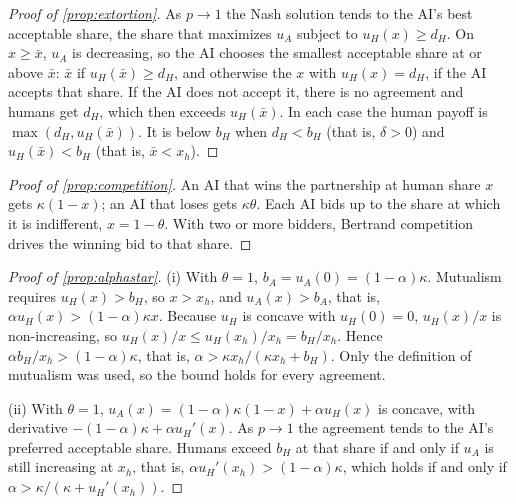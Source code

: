 \documentclass[article, 11pt, reqno]{amsart}
\theoremstyle{named}
\newcommand{\bH}{b_H}
\newcommand{\dH}{d_H}
\theoremstyle{plain}
\begin{document}
\begin{proof}[Proof of \cref{prop:extortion}]
As $p \to 1$ the Nash solution tends to the AI's best acceptable share, the share that maximizes $u_A$ subject to $u_H(x) \ge \dH$. On $x \ge \bar{x}$, $u_A$ is decreasing, so the AI chooses the smallest acceptable share at or above $\bar{x}$: $\bar{x}$ if $u_H(\bar x) \ge \dH$, and otherwise the $x$ with $u_H(x) = \dH$, if the AI accepts that share. If the AI does not accept it, there is no agreement and humans get $\dH$, which then exceeds $u_H(\bar{x})$. In each case the human payoff is $\max(\dH, u_H(\bar{x}))$. It is below $\bH$ when $\dH < \bH$ (that is, $\delta > 0$) and $u_H(\bar x) < \bH$ (that is, $\bar x < x_h$).
\end{proof}

\begin{proof}[Proof of \cref{prop:competition}]
An AI that wins the partnership at human share $x$ gets $\kappa(1-x)$; an AI that loses gets $\kappa\theta$. Each AI bids up to the share at which it is indifferent, $x = 1 - \theta$. With two or more bidders, Bertrand competition drives the winning bid to that share.
\end{proof}

\begin{proof}[Proof of \cref{prop:alphastar}]
(i) With $\theta = 1$, $b_A = u_A(0) = (1-\alpha)\kappa$. Mutualism requires $u_H(x) > \bH$, so $x > x_h$, and $u_A(x) > b_A$, that is, $\alpha u_H(x) > (1-\alpha)\kappa x$. Because $u_H$ is concave with $u_H(0) = 0$, $u_H(x)/x$ is non-increasing, so $u_H(x)/x \le u_H(x_h)/x_h = \bH/x_h$. Hence $\alpha \bH / x_h > (1-\alpha)\kappa$, that is, $\alpha > \kappa x_h/(\kappa x_h + \bH)$. Only the definition of mutualism was used, so the bound holds for every agreement.

(ii) With $\theta = 1$, $u_A(x) = (1-\alpha)\kappa(1-x) + \alpha u_H(x)$ is concave, with derivative $-(1-\alpha)\kappa + \alpha u_H'(x)$. As $p \to 1$ the agreement tends to the AI's preferred acceptable share. Humans exceed $\bH$ at that share if and only if $u_A$ is still increasing at $x_h$, that is, $\alpha u_H'(x_h) > (1-\alpha)\kappa$, which holds if and only if $\alpha > \kappa/(\kappa + u_H'(x_h))$.
\end{proof}
\end{document}
